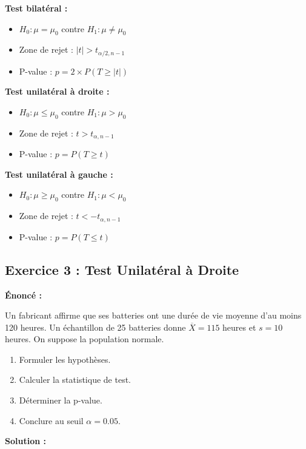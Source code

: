 \documentclass[11pt,a4paper]{article}
\begin{document}
\begin{rappelbox}
\textbf{Test bilatéral :}
\begin{itemize}
    \item $H_0 : \mu = \mu_0$ contre $H_1 : \mu \neq \mu_0$
    \item Zone de rejet : $|t| > t_{\alpha/2, n-1}$
    \item P-value : $p = 2 \times P(T \geq |t|)$
\end{itemize}

\textbf{Test unilatéral à droite :}
\begin{itemize}
    \item $H_0 : \mu \leq \mu_0$ contre $H_1 : \mu > \mu_0$
    \item Zone de rejet : $t > t_{\alpha, n-1}$
    \item P-value : $p = P(T \geq t)$
\end{itemize}

\textbf{Test unilatéral à gauche :}
\begin{itemize}
    \item $H_0 : \mu \geq \mu_0$ contre $H_1 : \mu < \mu_0$
    \item Zone de rejet : $t < -t_{\alpha, n-1}$
    \item P-value : $p = P(T \leq t)$
\end{itemize}
\end{rappelbox}

\subsection{Exercice 3 : Test Unilatéral à Droite}

\textbf{Énoncé :}

Un fabricant affirme que ses batteries ont une durée de vie moyenne d'au moins 120 heures. Un échantillon de 25 batteries donne $\overline{X} = 115$ heures et $s = 10$ heures. On suppose la population normale.

\begin{enumerate}
    \item Formuler les hypothèses.
    \item Calculer la statistique de test.
    \item Déterminer la p-value.
    \item Conclure au seuil $\alpha = 0.05$.
\end{enumerate}

\textbf{Solution :}
\end{document}
